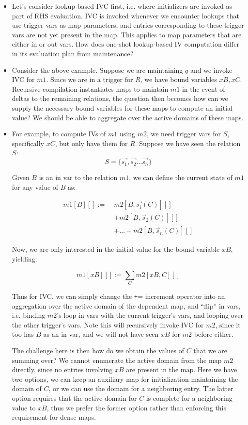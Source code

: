 \begin{itemize}
  \item Let's consider lookup-based IVC first, i.e. where initializers are
  invoked as part of RHS evaluation. IVC is invoked whenever we encounter
  lookups that use trigger vars as map parameters, and entries corresponding to
  these trigger vars are not yet present in the map. This applies to map
  parameters that are either in or out vars. How does one-shot lookup-based IV
  computation differ in its evaluation plan from maintenance?
  
  \item Consider the above example. Suppose we are maintaining $q$ and we
  invoke IVC for $m1$. Since we are in a trigger for $R$, we have bound
  variables $xB, xC$. Recursive compilation instantiates maps to maintain $m1$
  in the event of deltas to the remaining relations, the question then becomes
  how can we supply the necessary bound variables for these maps to compute an
  initial value? We should be able to aggregate over the active domains of these
  maps.
  
  \item For example, to compute IVs of $m1$ using $m2$, we need trigger vars for
  $S$, specifically $xC$, but only have them for $R$. Suppose we have seen the
  relation $S$:
  \[S = \{\vec{s_1}, \vec{s_2} \ldots \vec{s_n}\}\]
  
  Given $B$ is an in var to the relation $m1$, we can define the current state
  of $m1$ for any value of $B$ as:
  
  \begin{align*}
  m1[B][] := \; & m2[B,\vec{s_1}(C)][] \\
  & + m2[B,\vec{s}_2(C)][]\\
  & + \ldots + m2[B,\vec{s}_n(C)][]
  \end{align*}
  
  Now, we are only interested in the initial value for the bound
  variable $xB$, yielding:
  
  \[m1[xB][] := \sum_C m2[xB,C][]\]

  Thus for IVC, we can simply change the {\tt+}= increment operator into an
  aggregation over the active domain of the dependent map, and ``flip'' in vars,
  i.e. binding $m2$'s loop in vars with the current trigger's vars, and looping
  over the other trigger's vars. Note this will recursively invoke IVC for $m2$,
  since it too has $B$ as an in var, and we will not have seen $xB$ for $m2$
  before either.

  The challenge here is then how do we obtain the values of $C$ that we are
  summing over? We cannot enumerate the active domain from the map $m2$
  directly, since no entries involving $xB$ are present in the map. Here we
  have two options, we can keep an auxiliary map for initialization maintaining
  the domain of $C$, or we can use the domain for a neighboring entry. The
  latter option requires that the active domain for $C$ is complete for a
  neighboring value to $xB$, thus we prefer the former option rather than
  enforcing this requirement for dense maps.
  

\end{itemize}
